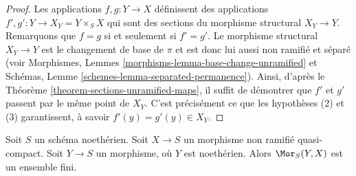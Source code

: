 \begin{proof}
Les applications $f, g : Y \to X$ définissent des applications $f', g' : Y \to X_Y = Y \times_S X$
qui sont des sections du morphisme structural $X_Y \to Y$.
Remarquons que $f = g$ si et seulement si $f' = g'$.
Le morphisme structural $X_Y \to Y$ est le changement de base de $\pi$ et est donc
lui aussi non ramifié et séparé (voir
Morphismes, Lemmes \ref{morphisms-lemma-base-change-unramified} et
Schémas, Lemme \ref{schemes-lemma-separated-permanence}).
Ainsi, d'après le Théorème \ref{theorem-sections-unramified-maps},
il suffit de démontrer que $f'$ et $g'$ passent par le même
point de $X_Y$. C'est précisément ce que les hypothèses (2) et (3)
garantissent, à savoir $f'(y) = g'(y) \in X_Y$.
\end{proof}

\begin{lemma}
\label{lemma-finitely-many-maps-to-unramified}
Soit $S$ un schéma noethérien. Soit $X \to S$ un morphisme non ramifié quasi-compact.
Soit $Y \to S$ un morphisme, où $Y$ est noethérien. Alors
$\Mor_S(Y, X)$ est un ensemble fini.
\end{lemma}

